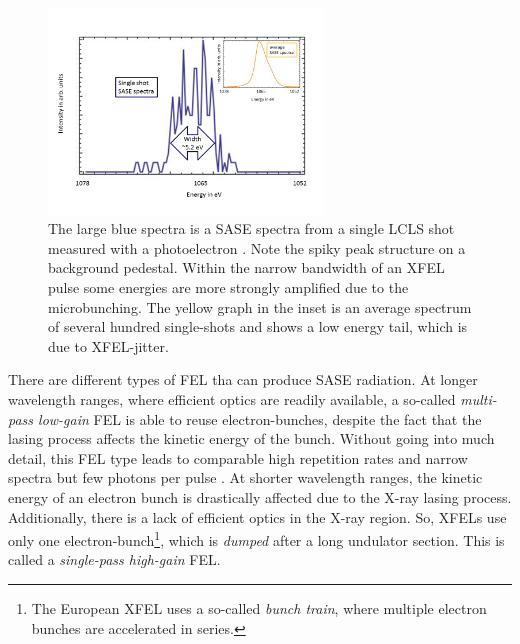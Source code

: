 \begin{figure}
	\centering
		\includegraphics[width=0.65\textwidth]{images/SASE-spectra.png}
	\caption[SASE single-shot and average spectra.]{The large blue spectra is a SASE spectra from a single LCLS shot measured with a photoelectron \citep[see][]{Bucher-2014-Unpublished}. Note the spiky peak structure on a background pedestal. Within the narrow bandwidth of an XFEL pulse some energies are more strongly amplified due to the microbunching. The yellow graph in the inset is an average spectrum of several hundred single-shots and shows a low energy tail, which is due to XFEL-jitter.}
	\label{fig:SASE-spectra}
\end{figure}
%
There are different types of FEL tha can produce SASE radiation. At longer wavelength ranges, where efficient optics are readily available, a so-called \textit{multi-pass low-gain} FEL is able to reuse electron-bunches, despite the fact that the lasing process affects the kinetic energy of the bunch. Without going into much detail, this FEL type leads to comparable high repetition rates and narrow spectra but few photons per pulse \citep{Kim-2008-PRL}. At shorter wavelength ranges, the kinetic energy of an electron bunch is drastically affected due to the X-ray lasing process. Additionally, there is a lack of efficient optics in the X-ray region. So, XFELs use only one electron-bunch\footnote{The European XFEL uses a so-called \textit{bunch train}, where multiple electron bunches are accelerated in series.}, which is \textit{dumped} after a long undulator section. This is called a \textit{single-pass high-gain} FEL.
%
%
%
%
